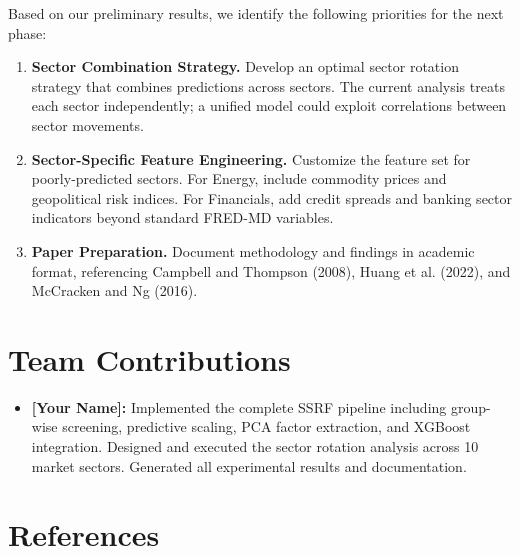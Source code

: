 \documentclass{article}
\begin{document}
Based on our preliminary results, we identify the following priorities for the next phase:

\begin{enumerate}
    \item \textbf{Sector Combination Strategy.} Develop an optimal sector rotation strategy that combines predictions across sectors. The current analysis treats each sector independently; a unified model could exploit correlations between sector movements.

    \item \textbf{Sector-Specific Feature Engineering.} Customize the feature set for poorly-predicted sectors. For Energy, include commodity prices and geopolitical risk indices. For Financials, add credit spreads and banking sector indicators beyond standard FRED-MD variables.

    \item \textbf{Paper Preparation.} Document methodology and findings in academic format, referencing Campbell and Thompson (2008), Huang et al. (2022), and McCracken and Ng (2016).
\end{enumerate}

\section{Team Contributions}

\begin{itemize}
    \item \textbf{[Your Name]:} Implemented the complete SSRF pipeline including group-wise screening, predictive scaling, PCA factor extraction, and XGBoost integration. Designed and executed the sector rotation analysis across 10 market sectors. Generated all experimental results and documentation.
\end{itemize}

\section{References}
\end{document}
